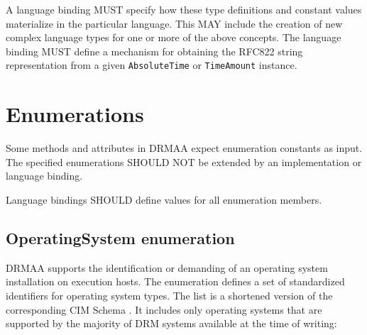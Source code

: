\documentclass{article}
\newcommand{\h}[1]{\lstinline|#1|}
\newcommand{\langbind}[1]{\begin{shaded}#1\end{shaded}}
\newcommand{\rat}[1]{}
\begin{document}
\langbind{
A language binding MUST specify how these type definitions and constant values materialize in the particular language. This MAY include the creation of new complex language types for one or more of the above concepts. The language binding MUST define a mechanism for obtaining the RFC822 string representation from a given \h{AbsoluteTime} or \h{TimeAmount} instance.
}

\rat{
The PartialTimestamp functionality from DRMAA 1.0 was completely removed. Absolute date and time values are now expressed as RFC822 conformant data items with stringification support (conf. call Mar 31st 2009). String list for job identifiers are replaced by Job object lists (F2F meeting July 2009).

Placeholders for new job template attributes were rejected, in order to avoid circular dependencies (Conf. call Oct 20th 2010). Any extended semantic of placeholders in comparison to DRMAA1 was rejected, since the support in the DRM system didn't change. (conf call Apr. 20th 2011).
}	
	
\section{Enumerations}

Some methods and attributes in DRMAA expect enumeration constants as input. The specified enumerations SHOULD NOT be extended by an implementation or language binding.

\langbind{
Language bindings SHOULD define values for all enumeration members.
}

\rat{Enumeration member value definitions are expected from the binding in order to foster binary portability of DRMAA-based applications.} 

\subsection{OperatingSystem enumeration}
\label{sec:ostypes}

DRMAA supports the identification or demanding of an operating system installation on execution hosts. The enumeration defines a set of standardized identifiers for operating system types. The list is a shortened version of the corresponding CIM Schema \cite{cim}. It includes only operating systems that are supported by the majority of DRM systems available at the time of writing:


\end{document}
